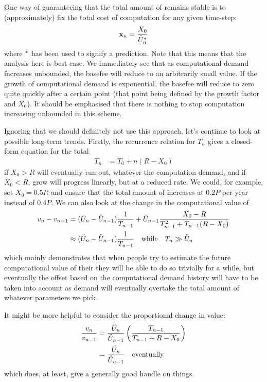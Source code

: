 \documentclass[11pt,a4paper]{article}
\begin{document}
One way of guaranteeing that the total amount of \ether remains stable is to (approximately) fix the total cost of computation for any given time-step:
\begin{equation}
\mathbf x_n = \frac{X_0}{\ddot{U}^{*}_n}
\end{equation}
where $^{*}$ has been used to signify a prediction. Note that this means that the analysis here is best-case. We immediately see that as computational demand \U increases unbounded, the basefee will reduce to an arbitrarily small value. If the growth of computational demand is exponential, the basefee will reduce to zero quite quickly after a certain point (that point being defined by the growth factor and $X_0$). It should be emphasised that there is nothing to stop computation increasing unbounded in this scheme.

Ignoring that we should definitely not use this approach, let's continue to look at possible long-term trends. Firstly, the recurrence relation for $T_n$ gives a closed-form equation for the total
\begin{align}
T_n &= T_0 + n(R - X_0)
\end{align} 
\ie if $X_0 > R$ \ether will eventually run out, whatever the computation demand, and if $X_0 < R$, \ether grow will progress linearly, but at a reduced rate. We could, for example, set $X_0 = 0.5R$ and ensure that the total amount of \ether increases at $0.2P$ per year instead of $0.4P$. We can also look at the change in the computational value of \ether
\begin{align}
v_n - v_{n-1} &= (\ddot{U}_n - \ddot{U}_{n-1})\frac{1}{T_{n-1}} + \ddot{U}_{n-1}\frac{X_0 - R}{T_{n-1}^2 + T_{n-1}(R - X_0)}\\
&\approx (\ddot{U}_n - \ddot{U}_{n-1})\frac{1}{T_{n-1}} \quad\mathrm{while}\quad T_n\gg\ddot{U}_n 
\end{align}
which mainly demonstrates that when people try to estimate the future computational value of their \ether they will be able to do so trivially for a while, but eventually the offset based on the computational demand history will have to be taken into account as demand will eventually overtake the total amount of \ether whatever parameters we pick.

It might be more helpful to consider the proportional change in value:
\begin{align}
\frac{v_n}{v_{n-1}} &= \frac{\ddot{U}_n}{\ddot{U}_{n-1}} \left( \frac{T_{n-1}}{T_{n-1} + R -X_0} \right) \\
&= \frac{\ddot{U}_n}{\ddot{U}_{n-1}} \quad\mathrm{eventually}
\end{align}
which does, at least, give a generally good handle on things.
\end{document}
